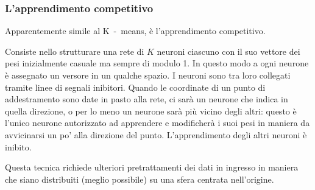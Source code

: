 \subsubsection{L'apprendimento competitivo}
Apparentemente simile al K~-~means,
\`e l'apprendimento competitivo\footnotemark{}.


Consiste nello strutturare una rete di $K$ neuroni
ciascuno con il suo vettore dei pesi
inizialmente casuale ma sempre di modulo 1.
In questo modo a ogni neurone \`e assegnato un versore
in un qualche spazio.
I neuroni sono tra loro collegati tramite linee di segnali inibitori.
Quando le coordinate di un punto di addestramento
sono date in pasto alla rete,
ci sar\`a un neurone che indica in quella direzione,
o per lo meno un neurone sar\`a pi\`u vicino degli altri:
questo \`e l'unico neurone autorizzato ad apprendere
e modificher\`a i suoi pesi in maniera da avvicinarsi
un po' alla direzione del punto.
L'apprendimento degli altri neuroni \`e inibito.

Questa tecnica richiede ulteriori pretrattamenti dei dati in ingresso
in maniera che siano distribuiti (meglio possibile)
su una sfera centrata nell'origine.